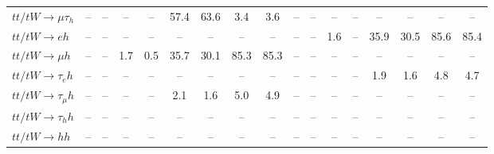 \begin{sidewaystable}[ht]
{\begin{tabular}{|l|cc|cc|cc|cc|cc|cc|cc|cc|}
    $tt/tW \to \mu\tau_{h}$            &   -- &   -- &   -- &   -- & 57.4 & 63.6 &  3.4 &  3.6 &   -- &   -- &   -- &   -- &   -- &   -- &   -- &   -- \\ 
    $tt/tW \to eh$                     &   -- &   -- &   -- &   -- &   -- &   -- &   -- &   -- &   -- &   -- &  1.6 &   -- & 35.9 & 30.5 & 85.6 & 85.4 \\ 
    $tt/tW \to \mu h$                  &   -- &   -- &  1.7 &  0.5 & 35.7 & 30.1 & 85.3 & 85.3 &   -- &   -- &   -- &   -- &   -- &   -- &   -- &   -- \\ 
    $tt/tW \to \tau_{e}h$              &   -- &   -- &   -- &   -- &   -- &   -- &   -- &   -- &   -- &   -- &   -- &   -- &  1.9 &  1.6 &  4.8 &  4.7 \\ 
    $tt/tW \to \tau_{\mu}h$            &   -- &   -- &   -- &   -- &  2.1 &  1.6 &  5.0 &  4.9 &   -- &   -- &   -- &   -- &   -- &   -- &   -- &   -- \\ 
    $tt/tW \to \tau_{h}h$              &   -- &   -- &   -- &   -- &   -- &   -- &   -- &   -- &   -- &   -- &   -- &   -- &   -- &   -- &   -- &   -- \\ 
    $tt/tW \to hh$                     &   -- &   -- &   -- &   -- &   -- &   -- &   -- &   -- &   -- &   -- &   -- &   -- &   -- &   -- &   -- &   -- \\ 

    \hline
    \end{tabular}}
    \label{sigcomp}
    
\end{sidewaystable}
